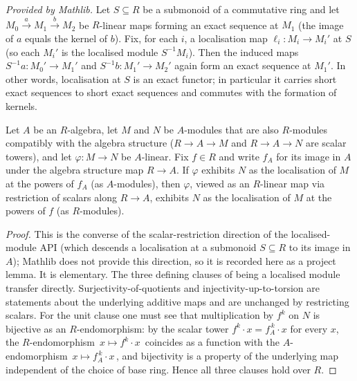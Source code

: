 \begin{lemma}
  \label{lem:localized_module_map_exact_mathlib}
  \mathlibok
  \textit{Provided by Mathlib.}
  Let \(S \subseteq R\) be a submonoid of a commutative ring and let
  \(M_0 \xrightarrow{\,a\,} M_1 \xrightarrow{\,b\,} M_2\) be \(R\)-linear maps forming an exact
  sequence at \(M_1\) (the image of \(a\) equals the kernel of \(b\)). Fix, for each \(i\), a
  localisation map \(\ell_i : M_i \to M_i'\) at \(S\) (so each \(M_i'\) is the localised module
  \(S^{-1} M_i\)). Then the induced maps \(S^{-1} a : M_0' \to M_1'\) and
  \(S^{-1} b : M_1' \to M_2'\) again form an exact sequence at \(M_1'\). In other words,
  localisation at \(S\) is an exact functor; in particular it carries short exact sequences to short
  exact sequences and commutes
  with the formation of kernels.
\end{lemma}

\begin{lemma}
  \label{lem:isLocalizedModule_powers_restrictScalars_of_algebraMap}
  Let \(A\) be an \(R\)-algebra, let \(M\) and \(N\) be \(A\)-modules that are also \(R\)-modules
  compatibly with the algebra structure (\(R \to A \to M\) and \(R \to A \to N\) are scalar towers),
  and let \(\varphi : M \to N\) be \(A\)-linear. Fix \(f \in R\) and write \(f_A\) for its image in
  \(A\) under the algebra structure map \(R \to A\). If \(\varphi\) exhibits \(N\) as the localisation of
  \(M\) at the powers of \(f_A\) (as \(A\)-modules), then
  \(\varphi\), viewed as an \(R\)-linear map via restriction of scalars along \(R \to A\), exhibits
  \(N\) as the localisation of \(M\) at the powers of \(f\) (as \(R\)-modules).
\end{lemma}
\begin{proof}

\leanok
  This is the converse of the scalar-restriction direction of the localised-module API (which
  descends a localisation at a submonoid \(S \subseteq R\) to its image in \(A\)); Mathlib does not
  provide this direction, so it is recorded here as a project lemma. It is elementary. The three
  defining clauses of being a localised module transfer directly. Surjectivity-of-quotients
  and injectivity-up-to-torsion are statements about the underlying additive maps and are unchanged by
  restricting scalars. For the unit clause one must see that multiplication by \(f^k\) on \(N\) is
  bijective as an \(R\)-endomorphism: by the scalar tower \(f^k \cdot x = f_A^{\,k} \cdot x\) for every
  \(x\), the \(R\)-endomorphism \(\,x \mapsto f^k \cdot x\,\) coincides as a function with the
  \(A\)-endomorphism \(\,x \mapsto f_A^{\,k} \cdot x\,\), and bijectivity is a property of the
  underlying map independent of the choice of base ring. Hence all three clauses hold over \(R\).
\end{proof}

